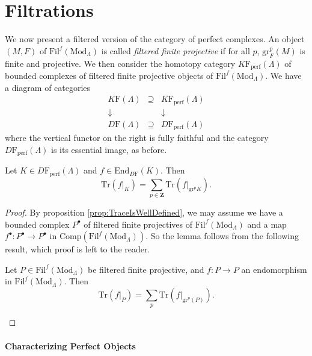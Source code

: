 \section{Filtrations} 

We now present a filtered version of the category of perfect complexes. An 
object $(M,F)$ of $\text{Fil}^f(\text{Mod}_\Lambda)$ is called {\it filtered 
finite projective} if for all $p$, $\text{gr}^p_F (M)$ is finite and 
projective. We then consider the homotopy category 
$K\mathrm{F}_{\text{perf}}(\Lambda)$ of bounded complexes of filtered finite 
projective objects of $\text{Fil}^f(\text{Mod}_\Lambda)$. We have a diagram of 
categories
$$
\begin{matrix}
K\mathrm{F}(\Lambda) & \supseteq & K\mathrm{F}_{\text{perf}}(\Lambda)\\
\downarrow & & \downarrow\\
D\mathrm{F}(\Lambda)  & \supseteq & D\mathrm{F}_{\text{perf}}(\Lambda)
\end{matrix}
$$
where the vertical functor on the right is fully faithful and the category 
$D\mathrm{F}_{\text{perf}}(\Lambda)$ is its essential image, as before.

\begin{lemma}[Additivity] 
Let $K\in D\mathrm{F}_{\text{perf}}(\Lambda)$ and $f\in 
\text{End}_{D\mathrm{F}}(K)$. Then 
$$
\text{Tr}(f|_K) = \sum_{p\in \mathbf{Z}} \text{Tr}(f|_{\text{gr}^p K}).
$$
\end{lemma}

\begin{proof} 
By proposition \ref{prop:TraceIsWellDefined}, we may assume we have a bounded 
complex $P^\bullet$ of filtered finite projectives of 
$\text{Fil}^f(\text{Mod}_\Lambda)$ and a map $f^\bullet: P^\bullet\to 
P^\bullet$ in $\text{Comp}(\text{Fil}^f(\text{Mod}_\Lambda))$. So the lemma 
follows from the following result, which proof is left to the reader.

\begin{lemma}
Let $P \in \text{Fil}^f(\text{Mod}_\Lambda)$ be filtered finite projective, and 
$f: P \to P$ an endomorphism in $\text{Fil}^f(\text{Mod}_\Lambda)$. Then
$$
\text{Tr}(f|_P) = \sum_p \text{Tr}(f|_{\text{gr}^p(P)}).
$$
\end{lemma}
\end{proof}

\paragraph{Characterizing Perfect Objects} 


